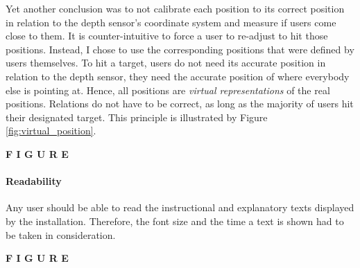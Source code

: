 Yet another conclusion was to not calibrate each position to its correct position in relation to the depth sensor's coordinate system  and measure if users come close to them. It is counter-intuitive to force a user to re-adjust to hit those positions. Instead, I chose to use the corresponding positions that were defined by users themselves. To hit a target, users do not need its accurate position in relation to the depth sensor, they need the accurate position of where everybody else is pointing at. Hence, all positions are \textit{virtual representations} of the real positions. Relations do not have to be correct, as long as the majority of users hit their designated target. This principle is illustrated by Figure \ref{fig:virtual_position}.

\textbf{F I G U R E}


\paragraph{Readability} Any user should be able to read the instructional and explanatory texts displayed by the installation. Therefore, the font size and the time a text is shown had to be taken in consideration. 

\textbf{F I G U R E}


